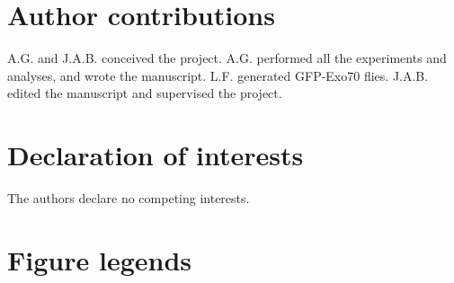 \documentclass[12pt, twoside, letterpaper]{article}
\begin{document}
\begin{doublespacing}
\begin{linenumbers}
    \section*{Author contributions}
    A.G. and J.A.B. conceived the project.
    A.G. performed all the experiments and analyses, and wrote the manuscript.
    L.F. generated GFP-Exo70 flies.
    J.A.B. edited the manuscript and supervised the project.
    
    \section*{Declaration of interests}
    The authors declare no competing interests.
    

    \section*{Figure legends}
    

\end{linenumbers}
\end{doublespacing}
\end{document}

